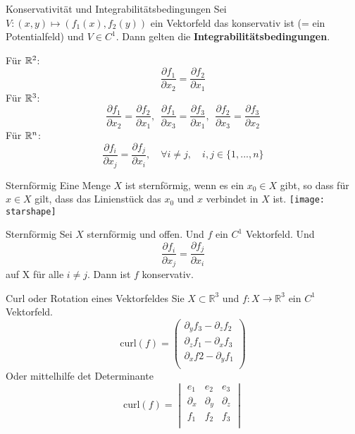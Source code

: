 \begin{Satz}{Konservativität und Integrabilitätsbedingungen}{}
    Sei $V: (x, y) \mapsto (f_1(x), f_2(y))$ ein Vektorfeld das konservativ ist (= ein Potentialfeld) und $V \in C^1$.
    Dann gelten die \textbf{Integrabilitätsbedingungen}.
    \begin{multicols}{2}
    Für $\mathbb{R}^2$:
    \[ \frac{\partial f_1}{\partial x_2} = \frac{\partial f_2}{\partial x_1} \]
    Für $\mathbb{R}^3$:
    \[ \frac{\partial f_1}{\partial x_2} =  \frac{\partial f_2}{\partial x_1}, 
    ~~  \frac{\partial f_1}{\partial x_3} = \frac{\partial f_3}{\partial x_1},
    ~~ \frac{\partial f_2}{\partial x_3} =  \frac{\partial f_3}{\partial x_2}
    \]
    Für $\mathbb{R}^n$:
    \[
        \frac{\partial f_i}{\partial x_j} =  \frac{\partial f_j}{\partial x_i},
        \quad
        \forall i \neq j,
        \quad
        i, j \in \{1,...,n\}
    \]
    \end{multicols}
\end{Satz}

\begin{Definition}{Sternförmig}{}
    Eine Menge $X$ ist sternförmig, wenn es ein $x_0 \in X$ gibt, so dass für $x \in X$ gilt, dass das Linienstück das $x_0$ und $x$ verbindet in $X$ ist. 
    \texttt{[image: starshape]}
\end{Definition}

\begin{Satz}{Sternförmig}{}
    Sei $X$ sternförmig und offen. Und $f$ ein $C^1$ Vektorfeld. Und 
    \[\frac{\partial f_i}{\partial x_j}=\frac{\partial f_j}{\partial x_i}\] auf X für alle $i \neq j$.
    Dann ist $f$ konservativ.

\end{Satz}

\begin{Definition}{Curl oder Rotation eines Vektorfeldes}{}
    Sie $X\subset \mathbb{R}^3$ und $f:X \rightarrow \mathbb{R}^3$ ein $C^1$ Vektorfeld.
    \[   
        \text{curl}(f) =
        \left(
        \begin{array}{c}
        \partial_{y}f_3 - \partial_zf_2\\
        \partial_zf_1 - \partial_x f_3\\
        \partial_xf2-\partial_yf_1\\
        \end{array}
        \right)
    \]
    Oder mittelhilfe det Determinante
    \[
        \text{curl}(f)=
        \begin{vmatrix}
        e_1 & e_2 & e_3\\
        \partial_x & \partial_y & \partial_z \\
        f_1 & f_2 & f_3\\
        \end{vmatrix}
    \]
\end{Definition}